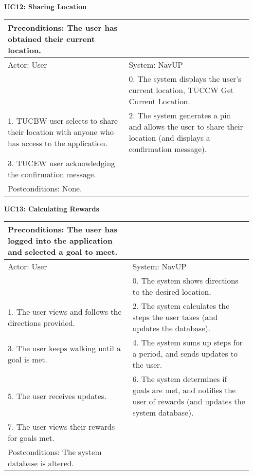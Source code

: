 \documentclass{article}
\begin{document}
		
        		\centering
					\textbf{UC12: Sharing Location}\\
       		 \small
       		 \begin{tabular}{|p{8cm}|p{8cm}|}
       		 \hline
       		 Preconditions: The user has obtained their current location.& \\
       		 \hline
       		 Actor: User & System: NavUP \\
        		\hline
       		  & 0.	The system displays the user's current location, TUCCW Get Current Location.\\
       		 \hline
       		 1.	TUCBW user selects to share their location with anyone who has access to the application. & 2.	The system generates a pin and allows the user to share their location (and displays a confirmation message).\\
        		\hline
       		3.	TUCEW user acknowledging the confirmation message. &\\
       		 \hline
        		Postconditions: None.& \\
        		\hline
        \end{tabular} 
       

		

	
        		\centering
					\textbf{UC13: Calculating Rewards}\\
       		 \small
       		 \begin{tabular}{|p{8cm}|p{8cm}|}
       		 \hline
       		 Preconditions: The user has logged into the application and selected a goal to meet.& \\
       		 \hline
       		 Actor: User & System: NavUP \\
        		\hline
       		 & 0.	The system shows directions to the desired location.\\
       		 \hline
       		 1.	The user views and follows the directions provided. & 2.	The system calculates the steps the user takes (and updates the database).\\
        		\hline
       		 3.	The user keeps walking until a goal is met. & 4.	The system sums up steps for a period, and sends updates to the user.\\
        		\hline
       		 5.	The user receives updates. & 6.	The system determines if goals are met, and notifies the user of rewards (and updates the system database).\\
        		\hline
        		7.	The user views their rewards for goals met. & \\
       		 \hline
        		Postconditions: The system database is altered. & \\
        		\hline
        \end{tabular} 
     
\end{document}
